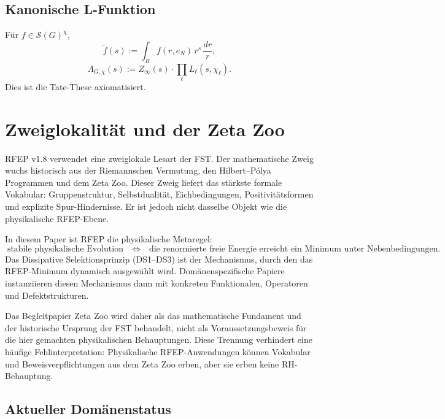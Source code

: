 \documentclass[11pt,a4paper]{article}
\theoremstyle{plain}
\theoremstyle{definition}
\renewcommand{\S}{\mathcal{S}}
\newcommand{\chifn}{\chi}
\begin{document}
\subsection{Kanonische L-Funktion}

Für $f \in \S(G)^\chifn$,
\[
  \tilde f(s) := \int_R f(r, e_N) \, r^s \, \frac{dr}{r},
\]
\[
  \Lambda_{G,\chifn}(s) := Z_\infty(s) \cdot \prod_\ell
    L_\ell(s, \chifn_\ell).
\]
Dies ist die Tate-These \cite{Tate1950} axiomatisiert.

\section{Zweiglokalität und der Zeta Zoo}
\label{sec:branch-locality}

RFEP v1.8 verwendet eine zweiglokale Lesart der FST. Der mathematische
Zweig wuchs historisch aus der Riemannschen Vermutung, den Hilbert--P\'olya
Programmen und dem Zeta Zoo. Dieser Zweig liefert das stärkste
formale Vokabular: Gruppenstruktur, Selbstdualität, Eichbedingungen,
Positivitätsformen und explizite Spur-Hindernisse. Er ist jedoch nicht dasselbe
Objekt wie die physikalische RFEP-Ebene.

In diesem Paper ist RFEP die physikalische Metaregel:
\[
  \text{stabile physikalische Evolution}
  \quad\Longleftrightarrow\quad
  \text{die renormierte freie Energie erreicht ein Minimum unter Nebenbedingungen.}
\]
Das Dissipative Selektionsprinzip (DS1--DS3) ist der Mechanismus, durch den
das RFEP-Minimum dynamisch ausgewählt wird. Domänenspezifische Papiere instanziieren diesen Mechanismus dann mit konkreten Funktionalen, Operatoren und Defektstrukturen.

Das Begleitpapier Zeta Zoo \cite{ZetaZooMaster} wird daher als das mathematische Fundament und der historische Ursprung der FST behandelt, nicht als Voraussetzungsbeweis für die hier gemachten physikalischen Behauptungen. Diese Trennung verhindert eine häufige Fehlinterpretation: Physikalische RFEP-Anwendungen können Vokabular und Beweisverpflichtungen aus dem Zeta Zoo erben, aber sie erben keine RH-Behauptung.

\subsection{Aktueller Domänenstatus}
\end{document}
